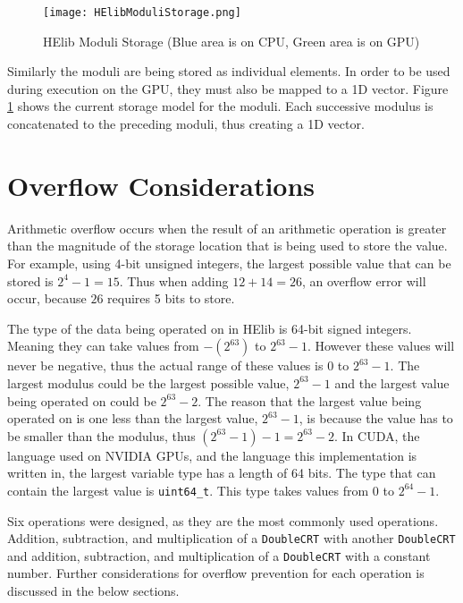 \begin{figure}[htp]
\centering
\texttt{[image: HElibModuliStorage.png]}
\caption{HElib Moduli Storage (Blue area is on CPU, Green area is on GPU)}
\label{fig:HElibModuliStorage}
\end{figure}

Similarly the moduli are being stored as individual elements. In order to be used during execution on the GPU, they must also be mapped to a 1D vector. Figure \ref{fig:HElibModuliStorage} shows the current storage model for the moduli. Each successive modulus is concatenated to the preceding moduli, thus creating a 1D vector.

\section{Overflow Considerations} \label{sec:OverflowConsiderations}
Arithmetic overflow occurs when the result of an arithmetic operation is greater than the magnitude of the storage location that is being used to store the value. For example, using 4-bit unsigned integers, the largest possible value that can be stored is $2^{4} - 1 = 15$. Thus when adding $12 + 14 = 26$, an overflow error will occur, because $26$ requires 5 bits to store. 

The type of the data being operated on in HElib is 64-bit signed integers. Meaning they can take values from $-(2^{63})$ to $2^{63} - 1$. However these values will never be negative, thus the actual range of these values is $0$ to $2^{63} - 1$. The largest modulus could be the largest possible value, $2^{63} - 1$ and the largest value being operated on could be $2^{63} - 2$. The reason that the largest value being operated on is one less than the largest value, $2^{63} - 1$, is because the value has to be smaller than the modulus, thus $(2^{63} - 1) - 1 = 2^{63} - 2$. In CUDA, the language used on NVIDIA GPUs, and the language this implementation is written in, the largest variable type has a length of 64 bits. The type that can contain the largest value is \verb|uint64_t|. This type takes values from 0 to $2^{64} - 1$.

Six operations were designed, as they are the most commonly used operations. Addition, subtraction, and multiplication of a \verb|DoubleCRT| with another \verb|DoubleCRT| and addition, subtraction, and multiplication of a \verb|DoubleCRT| with a constant number. Further considerations for overflow prevention for each operation is discussed in the below sections.

